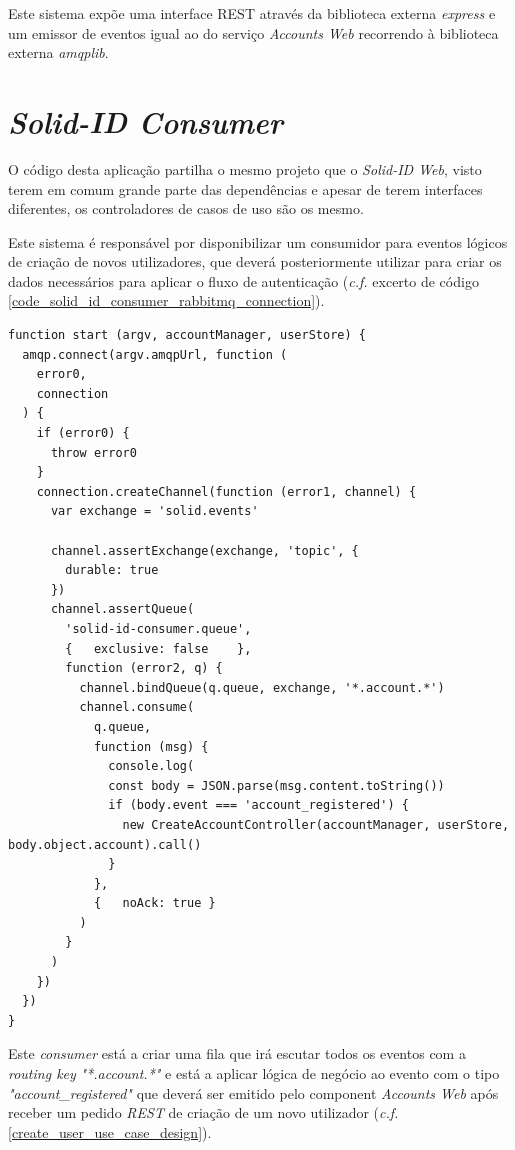 Este sistema expõe uma interface REST através da biblioteca externa \emph{express} e um emissor de eventos igual ao do serviço \emph{Accounts Web} recorrendo à biblioteca externa \emph{amqplib}.

\section{\emph{Solid-ID Consumer}}
O código desta aplicação partilha o mesmo projeto que o \emph{Solid-ID Web}, visto terem em comum grande parte das dependências e apesar de terem interfaces diferentes, os controladores de casos de uso são os mesmo.

Este sistema é responsável por disponibilizar um consumidor para eventos lógicos de criação de novos utilizadores, que deverá posteriormente utilizar para criar os dados necessários para aplicar o fluxo de autenticação (\emph{c.f.} excerto de código \ref{code_solid_id_consumer_rabbitmq_connection}).

\begin{lstlisting}[caption={\emph{Consumer} responsável pela ligação ao \emph{RabbitMQ}}, label={code_solid_id_consumer_rabbitmq_connection}]
function start (argv, accountManager, userStore) {
  amqp.connect(argv.amqpUrl, function (
    error0,
    connection
  ) {
    if (error0) {
      throw error0
    }
    connection.createChannel(function (error1, channel) {
      var exchange = 'solid.events'

      channel.assertExchange(exchange, 'topic', {
        durable: true
      })
      channel.assertQueue(
        'solid-id-consumer.queue',
        {   exclusive: false    },
        function (error2, q) {
          channel.bindQueue(q.queue, exchange, '*.account.*')
          channel.consume(
            q.queue,
            function (msg) {
              console.log(
              const body = JSON.parse(msg.content.toString())
              if (body.event === 'account_registered') {
                new CreateAccountController(accountManager, userStore, body.object.account).call()
              }
            },
            {   noAck: true }
          )
        }
      )
    })
  })
}

\end{lstlisting}

Este \emph{consumer} está a criar uma fila que irá escutar todos os eventos com a \emph{routing key} \emph{"*.account.*"} e está a aplicar lógica de negócio ao evento com o tipo \emph{"account\_registered"} que deverá ser emitido pelo component \emph{Accounts Web} após receber um pedido \emph{REST} de criação de um novo utilizador  (\emph{c.f.}  \ref{create_user_use_case_design}).

